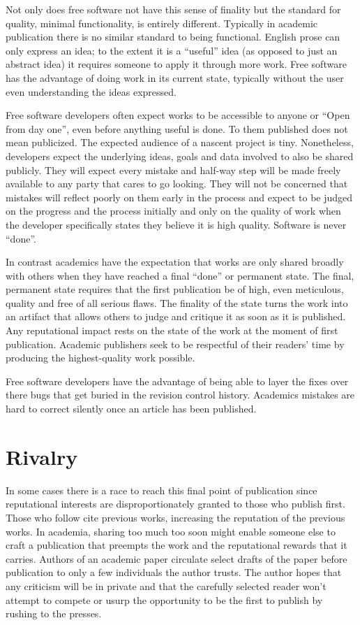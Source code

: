 \documentclass[
	fontsize=10pt, %
	twoside=false, %
	secnumdepth=1, %
]{kaobook}
\begin{document}
Not only does free software not have this sense of finality
but the standard for quality, minimal functionality, is entirely
different. Typically in academic publication there is no similar
standard to being functional. English prose can only express an idea;
to the extent it is a “useful” idea (as opposed to just an abstract
idea) it requires someone to apply it through more work. Free software
has the advantage of doing work in its current state, typically
without the user even understanding the ideas expressed.

Free software developers often expect works to be accessible to anyone
or “Open from day one”, even before anything useful is done. To them
published does not mean publicized. The expected audience of a nascent
project is tiny. Nonetheless, developers expect the underlying ideas,
goals and data involved to also be shared publicly. They will expect
every mistake and half-way step will be made freely available to any
party that cares to go looking. They will not be concerned that
mistakes will reflect poorly on them early in the process and expect
to be judged on the progress and the process initially and only on the
quality of work when the developer specifically states they believe it
is high quality. Software is never “done”.

In contrast academics have the expectation that works are only shared
broadly with others when they have reached a final “done” or permanent
state. The final, permanent state requires that the first publication
be of high, even meticulous, quality and free of all serious
flaws. The finality of the state turns the work into an artifact that
allows others to judge and critique it as soon as it is published. Any
reputational impact rests on the state of the work at the moment of
first publication. Academic publishers seek to be respectful of their
readers’ time by producing the highest-quality work possible.

Free software developers have the advantage of being able to layer the
fixes over there bugs that get buried in the revision control
history. Academics mistakes are hard to correct silently once an
article has been published.

\section{Rivalry}

In some cases there is a race to reach this final point of publication
since reputational interests are disproportionately granted to those
who publish first. Those who follow cite previous works, increasing
the reputation of the previous works. In academia, sharing too much
too soon might enable someone else to craft a publication that
preempts the work and the reputational rewards that it
carries. Authors of an academic paper circulate select drafts of the
paper before publication to only a few individuals the author
trusts. The author hopes that any criticism will be in private and
that the carefully selected reader won’t attempt to compete or usurp
the opportunity to be the first to publish by rushing to the presses.
\end{document}
